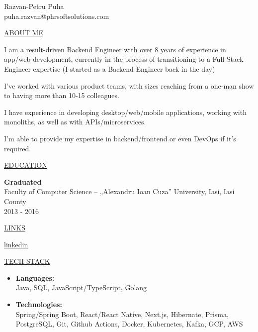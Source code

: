 \documentclass[11pt]{article}
\newcommand{\resumetitle}[3]{
    \AddToShipoutPictureBG{
        \AtPageUpperLeft {
        \raisebox{-0.09\paperheight}{
            \color{black!90}\rule{2\paperwidth}{\paperheight}
            }
        }
    }
    \begin{Center}
        \begingroup
        \titlethin
        \color{black!10}\Huge{#1}
        \titlethick
        \color{black!5}\Huge{#2} \\
        \vspace{2mm}
        \textrm{\color{black!15}\Large{#3}}
        \endgroup
    \end{Center}
    \vspace{7mm}
}
\newcommand{\betteruline}[1]{
    \uline{#1}
}
\newcommand{\sectiontitle}[1]{
    \begingroup
        \titlebold
        \betteruline{\Large\uppercase{#1}  }
        \vspace{1.7mm}
    \endgroup
}
\newcommand{\sectioncontent}[1]{
    \begingroup
        \begin{FlushLeft}
        \vspace{-3mm}
        \sffamily\small#1
        \end{FlushLeft}
    \endgroup
    \vspace{2mm}
}
\newcommand{\spacevv}{
    \vspace{2mm}
}
\begin{document}
    \resumetitle{Razvan-Petru}{Puha} {
        puha.razvan@phrsoftsolutions.com
    }

    \setlength{\columnsep}{7mm}
    \begin{paracol}{2}

    \sectiontitle{about me}
    \sectioncontent{
        I am a result-driven Backend Engineer with over 8 years of experience in app/web development, currently in the process of transitioning to a Full-Stack Engineer expertise (I started as a Backend Engineer back in the day)
        \spacevv
        \spacevv
        
        I've worked with various product teams, with sizes reaching from a one-man show to having more than 10-15 colleagues.
        \spacevv
        \spacevv
        
        I have experience in developing desktop/web/mobile applications, working with monoliths, as well as with APIs/microservices.
        \spacevv
        \spacevv
        
        I'm able to provide my expertise in backend/frontend or even DevOps if it's required.
    }

    \sectiontitle{education}
    \sectioncontent{
        \vspace{2mm}
        \textbf{Graduated} \\
        Faculty of Computer Science – „Alexandru Ioan Cuza” University, Iasi, Iasi County \\
        \textcolor{black!70}{2013 - 2016} \\
    }

    \sectiontitle{links}
    \sectioncontent{
        \hspace{2.1mm}
        \href{https://www.linkedin.com/in/razvan-petru-puha-5a4582120/}{linkedin} \\
    }

    \sectiontitle{tech stack}
    \sectioncontent{
        \begin{itemize}
            \item \textbf{Languages:} \\
            Java, SQL, JavaScript/TypeScript, Golang
            \item  \textbf{Technologies:} \\
            Spring/Spring Boot, React/React Native, Next.js, Hibernate, Prisma, PostgreSQL, Git, Github Actions, Docker, Kubernetes, Kafka, GCP, AWS
        \end{itemize}  
    }


\end{paracol}
\end{document}
